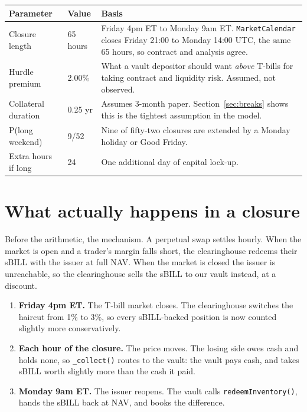 \documentclass[11pt,a4paper]{article}
\begin{document}
\begin{center}
\small
\begin{tabular}{@{}p{4.5cm}p{1.9cm}p{8.6cm}@{}}
\toprule
\textbf{Parameter} & \textbf{Value} & \textbf{Basis} \\
\midrule
Closure length & 65 hours & Friday 4pm ET to Monday 9am ET. \texttt{MarketCalendar} closes Friday 21:00 to Monday 14:00 UTC, the same 65 hours, so contract and analysis agree. \\
Hurdle premium & 2.00\% & What a vault depositor should want \emph{above} T-bills for taking contract and liquidity risk. Assumed, not observed. \\
Collateral duration & 0.25 yr & Assumes 3-month paper. Section~\ref{sec:breaks} shows this is the tightest assumption in the model. \\
P(long weekend) & 9/52 & Nine of fifty-two closures are extended by a Monday holiday or Good Friday. \\
Extra hours if long & 24 & One additional day of capital lock-up. \\
\bottomrule
\end{tabular}
\end{center}

\section{What actually happens in a closure}

Before the arithmetic, the mechanism. A perpetual swap settles hourly. When the market is
open and a trader's margin falls short, the clearinghouse redeems their sBILL with the
issuer at full NAV. When the market is closed the issuer is unreachable, so the
clearinghouse sells the sBILL to our vault instead, at a discount.

\begin{enumerate}
\item \textbf{Friday 4pm ET.} The T-bill market closes. The clearinghouse switches the
      haircut from 1\% to 3\%, so every sBILL-backed position is now counted slightly
      more conservatively.
\item \textbf{Each hour of the closure.} The price moves. The losing side owes cash and
      holds none, so \texttt{\_collect()} routes to the vault: the vault pays cash, and
      takes sBILL worth slightly more than the cash it paid.
\item \textbf{Monday 9am ET.} The issuer reopens. The vault calls
      \texttt{redeemInventory()}, hands the sBILL back at NAV, and books the difference.
\end{enumerate}
\end{document}
